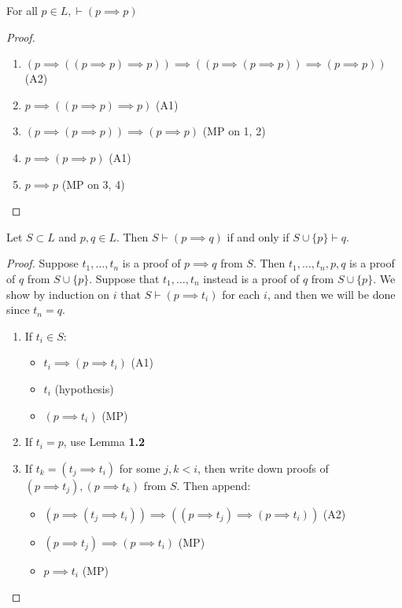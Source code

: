 \documentclass[10pt,a4paper]{article}
\begin{document}
\begin{lemma}
For all $p \in L, \vdash (p \implies p)$
\end{lemma}
\begin{proof}
\item
\begin{enumerate}
\item $(p \implies ((p \implies p) \implies p)) \implies ((p \implies (p\implies p))\implies (p \implies p))$ \hfill (A2)
\item $p \implies ((p \implies p)\implies p)$ \hfill (A1)
\item $(p \implies (p \implies p)) \implies (p \implies p)$ \hfill (MP on 1, 2)
\item $p \implies (p \implies p)$ \hfill (A1)
\item $p \implies p$ \hfill (MP on 3, 4)
\end{enumerate}
\end{proof}
\begin{proposition}
Let $S \subset L$ and $p, q \in L$. Then $S \vdash (p \implies q)$ if and only if $S \cup \{p\} \vdash q$.
\end{proposition}
\begin{proof}
Suppose $t_1, \ldots, t_n$ is a proof of $p \implies q$ from $S$. Then $t_1, \ldots, t_n, p, q$ is a proof of $q$ from $S \cup \{p\}$. Suppose that $t_1, \ldots, t_n$ instead is a proof of $q$ from $S \cup \{p\}$. We show by induction on $i$ that $S \vdash (p \implies t_i)$ for each $i$, and then we will be done since $t_n = q$.
\begin{enumerate}
\item If $t_i \in S$:
\begin{itemize}
\item $t_i \implies (p \implies t_i)$ \hfill (A1)
\item $t_i$ \hfill (hypothesis)
\item $(p \implies t_i)$ \hfill (MP)
\end{itemize}
\item If $t_i = p$, use Lemma \textbf{1.2}
\item If $t_k = (t_j \implies t_i)$ for some $j, k < i$, then write down proofs of $(p \implies t_j), (p \implies t_k)$ from $S$. Then append:
\begin{itemize}
\item $(p \implies (t_j \implies t_i)) \implies ((p \implies t_j) \implies (p \implies t_i))$ \hfill (A2)
\item $(p \implies t_j) \implies (p \implies t_i)$ \hfill (MP)
\item $p \implies t_i$ \hfill (MP)
\end{itemize}
\end{enumerate}
\end{proof}
\end{document}
